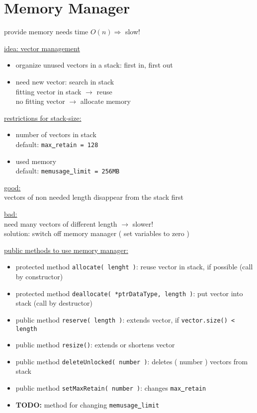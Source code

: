 \chapter{Memory Manager}

provide memory needs time $O(n)\Rightarrow$ slow!

\underline{ idea: vector management }
\vspace{-1ex}
\begin{itemize}
\item organize unused vectors in a stack: first in, first out
\item need new vector: search in stack \\ fitting vector in stack $\rightarrow$ reuse \\ no fitting vector $\rightarrow$ allocate memory
\end{itemize}

\underline{ restrictions for stack-size: }
\vspace{-1ex}
\begin{itemize}
\item number of vectors in stack\\ default: \texttt{max\underline{ }retain = 128}
\item used memory\\ default: \texttt{memusage\underline{ }limit = 256MB}
\end{itemize}


\underline{ good: } \\ vectors of non needed length disappear from the stack first

\underline{ bad: } \\ need many vectors of different length $\rightarrow$ slower! \\
solution: switch off memory manager ( set variables to zero )

\underline{ public methods to use memory manager: }
\begin{itemize}
\item protected method \texttt{allocate( lenght )}: reuse vector in stack, if possible (call by constructor)
\item protected method \texttt{deallocate( *ptrDataType, length )}: put vector into stack (call by destructor)
\item public method \texttt{reserve( length )}: extends vector, if \texttt{vector.size() < length}
\item public method \texttt{resize()}: extends or shortens vector
\item public method \texttt{deleteUnlocked( number )}: deletes ( number ) vectors from stack
\item public method \texttt{setMaxRetain( number )}: changes \texttt{max\underline{ }retain}
\item \textbf{TODO: } method for changing \texttt{memusage\underline{ }limit}
\end{itemize}


